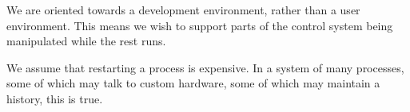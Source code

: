 

We are oriented towards a development environment, rather than
  a user environment.  This means we wish to support parts of the
  control system being manipulated while the rest runs.

We assume that restarting a process is expensive.  In a system
  of many processes, some of which may talk to custom hardware,
  some of which may maintain a history, this is true.
